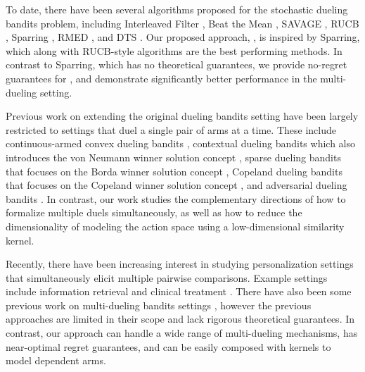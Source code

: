 
To date, there have been several algorithms proposed for the stochastic dueling bandits problem, including Interleaved Filter \citep{yue2012k}, Beat the Mean \citep{yue2011beat}, SAVAGE \citep{urvoy2013generic}, RUCB \citep{zoghi2014relative,zoghi2015mergerucb}, Sparring \citep{ailon2014reducing,dudik2015contextual}, RMED \citep{komiyama2015regret}, and DTS \citep{wu2016doublets}.  Our proposed approach, \selfsparring, is inspired by Sparring, which along with RUCB-style algorithms are the best performing methods.  In contrast to Sparring, which has no theoretical guarantees, we provide no-regret guarantees for \selfsparring, and demonstrate significantly better performance in the multi-dueling setting. 

Previous work on extending the original dueling bandits setting have been largely restricted to settings that duel a single pair of arms at a time. These include continuous-armed convex dueling bandits \citep{yue2009interactively}, contextual dueling bandits which also introduces the von Neumann winner solution concept \citep{dudik2015contextual}, sparse dueling bandits that focuses on the Borda winner solution concept \citep{jamieson2015sparse}, Copeland dueling bandits that focuses on the Copeland winner solution concept \citep{zoghi2015copeland}, and adversarial dueling bandits \citep{gajane2015relative}.
In contrast, our work studies the complementary directions of how to formalize multiple duels simultaneously, as well as how to reduce the dimensionality of modeling the action space using a low-dimensional similarity kernel. %

Recently, there have been increasing interest in studying personalization settings that simultaneously elicit multiple pairwise comparisons.  Example settings include information retrieval \citep{hofmann2011probabilistic,schuth2014multileaved,schuth2016multileave} and clinical treatment \citep{sui2014clinical}. There have also been some previous work on multi-dueling bandits settings  \citep{brost2016multi,sui2014clinical,schuth2016multileave}, however the previous approaches are limited in their scope and lack rigorous theoretical guarantees.  In contrast, our approach can handle a wide range of multi-dueling mechanisms, has near-optimal regret guarantees, and can be easily composed with kernels to model dependent arms.

